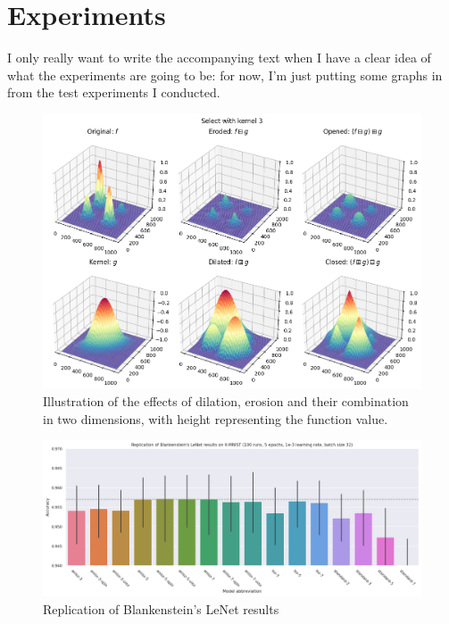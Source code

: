 \documentclass[a4paper, 12pt]{report}
\def\comment#1{\color{red}#1\color{black}}
\begin{document}
\chapter{Experiments}
\comment{I only really want to write the accompanying text when I have a clear idea of what the experiments are going to be: for now, I'm just putting some graphs in from the test experiments I conducted.}
\begin{figure}[h!]
	\center
  \includegraphics[width=\textwidth]{figures/morphological_3d.png}
  \caption{Illustration of the effects of dilation, erosion and their combination in two dimensions, with height representing the function value.}
  \label{fig:dil-illust}
\end{figure}
\begin{figure}[h!]
	\center
  \includegraphics[width=\textwidth]{figures/thierry_replication.png}
  \caption{Replication of Blankenstein's LeNet results \cite{thierrybsc} }
  \label{fig:dil-illust}
\end{figure}
\end{document}
